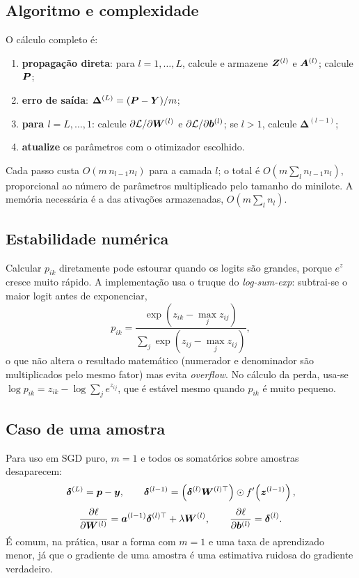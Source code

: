 \subsection{Algoritmo e complexidade}

O cálculo completo é:

\begin{enumerate}
	\item \textbf{propagação direta}: para $l=1,\dots,L$, calcule e armazene $\bm{Z}^{(l)}$ e
	      $\bm{A}^{(l)}$; calcule $\bm{P}$;
	\item \textbf{erro de saída}: $\bm{\Delta}^{(L)} = (\bm{P}-\bm{Y})/m$;
	\item \textbf{para $l=L,\dots,1$}: calcule $\partial\mathcal{L}/\partial\bm{W}^{(l)}$ e
	      $\partial\mathcal{L}/\partial\bm{b}^{(l)}$; se $l>1$, calcule $\bm{\Delta}^{(l-1)}$;
	\item \textbf{atualize} os parâmetros com o otimizador escolhido.
\end{enumerate}

Cada passo custa $O(m\,n_{l-1}n_l)$ para a camada $l$; o total é
$O\!\left(m\sum_l n_{l-1}n_l\right)$, proporcional ao número de parâmetros multiplicado pelo
tamanho do minilote. A memória necessária é a das ativações armazenadas,
$O\!\left(m\sum_l n_l\right)$.

\subsection{Estabilidade numérica}

Calcular $p_{ik}$ diretamente pode estourar quando os logits são grandes, porque $e^{z}$ cresce
muito rápido. A implementação usa o truque do \emph{log-sum-exp}: subtrai-se o maior logit antes de
exponenciar,
\begin{equation}
	p_{ik} = \frac{\exp\!\left(z_{ik} - \max_j z_{ij}\right)}{\sum_j \exp\!\left(z_{ij} - \max_j z_{ij}\right)},
\end{equation}
o que não altera o resultado matemático (numerador e denominador são multiplicados pelo mesmo
fator) mas evita \emph{overflow}. No cálculo da perda, usa-se
$\log p_{ik} = z_{ik} - \log\sum_j e^{z_{ij}}$, que é estável mesmo quando $p_{ik}$ é muito
pequeno.

\subsection{Caso de uma amostra}

Para uso em SGD puro, $m=1$ e todos os somatórios sobre amostras desaparecem:
\begin{equation}
	\bm{\delta}^{(L)} = \bm{p} - \bm{y}, \qquad
	\bm{\delta}^{(l-1)} = \left(\bm{\delta}^{(l)}\bm{W}^{(l)\top}\right)\odot f'\!\left(\bm{z}^{(l-1)}\right),
\end{equation}
\begin{equation}
	\frac{\partial \ell}{\partial \bm{W}^{(l)}} = \bm{a}^{(l-1)}\bm{\delta}^{(l)\top} + \lambda\bm{W}^{(l)},
	\qquad
	\frac{\partial \ell}{\partial \bm{b}^{(l)}} = \bm{\delta}^{(l)}.
\end{equation}
É comum, na prática, usar a forma com $m=1$ e uma taxa de aprendizado menor, já que o gradiente
de uma amostra é uma estimativa ruidosa do gradiente verdadeiro.

